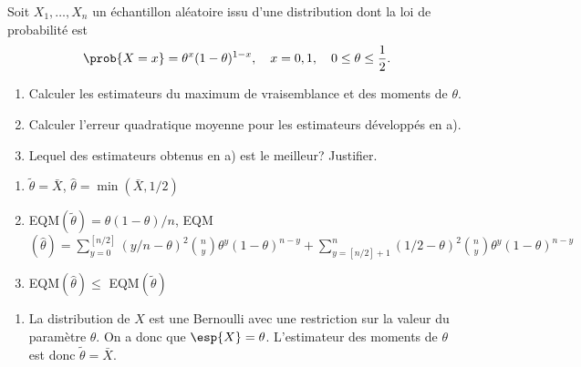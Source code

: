 \begin{exercice}
  \label{ex:ponctuelle:uniforme}
  Soit $X_1, \dots, X_n$ un échantillon aléatoire issu d'une
  distribution dont la loi de probabilité est
  \begin{displaymath}
    \prob{X = x} = \theta^x (1 - \theta)^{1 - x}, \quad x = 0, 1,
    \quad 0 \leq \theta \leq \frac{1}{2}.
  \end{displaymath}
  \begin{enumerate}
  \item Calculer les estimateurs du maximum de vraisemblance et des
    moments de $\theta$.
  \item Calculer l'erreur quadratique moyenne pour les estimateurs
    développés en a).
  \item Lequel des estimateurs obtenus en a) est le meilleur?
    Justifier.
  \end{enumerate}
  \begin{rep}
    \begin{enumerate}
    \item $\tilde{\theta} = \bar{X}$, $\hat{\theta} =
      \min(\bar{X}, 1/2)$
    \item EQM$(\tilde{\theta}) = \theta (1 - \theta)/n$,
      EQM$(\hat{\theta}) =
      \sum_{y = 0}^{[n/2]} (y/n - \theta)^2 \binom{n}{y} \theta^y (1 -
      \theta)^{n-y} + \sum_{y = [n/2] + 1}^n (1/2 - \theta)^2
      \binom{n}{y} \theta^y (1 - \theta)^{n - y}$
    \item EQM$(\hat{\theta}) \leq$ EQM$(\tilde{\theta})$
    \end{enumerate}
  \end{rep}
  \begin{sol}
    \begin{enumerate}
    \item La distribution de $X$ est une Bernoulli avec une
      restriction sur la valeur du paramètre $\theta$. On a donc que
      $\esp{X} = \theta$. L'estimateur des moments de $\theta$ est
      donc $\tilde{\theta} = \bar{X}$.


\end{enumerate}
\end{sol}
\end{exercice}
